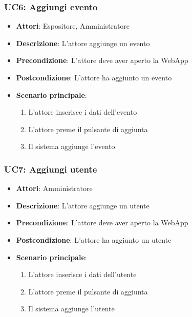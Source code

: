 \subsubsection{UC6: Aggiungi evento}
\label{subsubsec:uc6}
\begin{itemize}
    \item \textbf{Attori}: Espositore, Amministratore
    \item \textbf{Descrizione}: L'attore aggiunge un evento
    \item \textbf{Precondizione}: L'attore deve aver aperto la WebApp
    \item \textbf{Postcondizione}: L'attore ha aggiunto un evento
    \item \textbf{Scenario principale}:
    \begin{enumerate}
        \item L'attore inserisce i dati dell'evento
        \item L'attore preme il pulsante di aggiunta
        \item Il sistema aggiunge l'evento
    \end{enumerate}
\end{itemize}

\subsubsection{UC7: Aggiungi utente}
\label{subsubsec:uc7}
\begin{itemize}
    \item \textbf{Attori}: Amministratore
    \item \textbf{Descrizione}: L'attore aggiunge un utente
    \item \textbf{Precondizione}: L'attore deve aver aperto la WebApp
    \item \textbf{Postcondizione}: L'attore ha aggiunto un utente
    \item \textbf{Scenario principale}:
    \begin{enumerate}
        \item L'attore inserisce i dati dell'utente
        \item L'attore preme il pulsante di aggiunta
        \item Il sistema aggiunge l'utente
    \end{enumerate}
\end{itemize}

